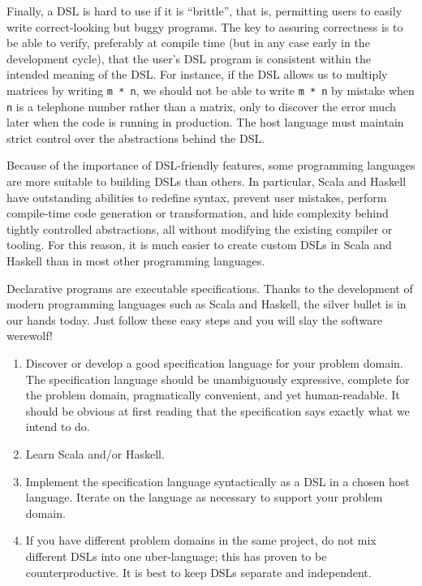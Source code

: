 Finally, a DSL is hard to use if it is \textsf{``}brittle\textsf{''}, \textemdash{}
that is, permitting users to easily write correct-looking but buggy
programs. The key to assuring correctness is to be able to verify,
preferably at compile time (but in any case early in the development
cycle), that the user\textsf{'}s DSL program is consistent within the intended
meaning of the DSL. For instance, if the DSL allows us to multiply
matrices by writing \lstinline!m * n!, we should not be able to write
\lstinline!m * n! by mistake when \lstinline!n! is a telephone number
rather than a matrix, only to discover the error much later when the
code is running in production. The host language must maintain strict
control over the abstractions behind the DSL.

Because of the importance of DSL-friendly features, some programming
languages are more suitable to building DSLs than others. In particular,
Scala and Haskell have outstanding abilities to redefine syntax, prevent
user mistakes, perform compile-time code generation or transformation,
and hide complexity behind tightly controlled abstractions, \textemdash{}
all without modifying the existing compiler or tooling. For this reason,
it is much easier to create custom DSLs in Scala and Haskell than
in most other programming languages. 


Declarative programs are executable specifications. Thanks to the
development of modern programming languages such as Scala and Haskell,
the silver bullet is in our hands today. Just follow these easy steps
and you will slay the software werewolf!
\begin{enumerate}
\item Discover or develop a good specification language for your problem
domain. The specification language should be unambiguously expressive,
complete for the problem domain, pragmatically convenient, and yet
human-readable. It should be obvious at first reading that the specification
says exactly what we intend to do.
\item Learn Scala and/or Haskell. 
\item Implement the specification language syntactically as a DSL in a chosen
host language. Iterate on the language as necessary to support your
problem domain. 
\item If you have different problem domains in the same project, do not
mix different DSLs into one uber-language; this has proven to be counterproductive.
It is best to keep DSLs separate and independent.
\end{enumerate}

